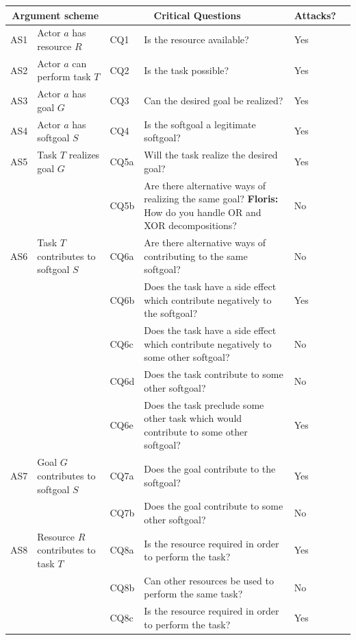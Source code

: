 \documentclass[11.5pt,two column]{llncs}
\newcommand{\floris}[1]{{\color{red}\textbf{Floris: }#1}}
\begin{document}
\begin{table}[h]
\centering
\begin{tabular}{|l|l|l|l|l|l|}
\hline
\multicolumn{2}{|c|}{\textbf{Argument scheme}} & \multicolumn{2}{c|}{\textbf{Critical Questions}} & \textbf{Attacks?}\\
\hline
AS1 & Actor $a$ has resource $R$ & CQ1 &Is the resource available? & Yes\\ %
\hline
AS2 & Actor $a$ can perform task $T$ & CQ2 &Is the task possible? & Yes\\
\hline
AS3 & Actor $a$ has goal $G$ & CQ3 & Can the desired goal be realized? & Yes\\
\hline
AS4 & Actor $a$ has softgoal $S$ & CQ4 & Is the softgoal a legitimate softgoal? & Yes\\
\hline
\hline
AS5 & Task $T$ realizes goal $G$ & CQ5a & Will the task realize the desired goal? & Yes\\
& & CQ5b & Are there alternative ways of realizing the same goal? \floris{How do you handle OR and XOR decompositions?} & No\\ %
\hline
AS6 & Task $T$ contributes to softgoal $S$ & CQ6a & Are there alternative ways of contributing to the same softgoal? & No\\
&& CQ6b & Does the task have a side effect which contribute negatively to the softgoal?&Yes\\
&& CQ6c & Does the task have a side effect which contribute negatively to some other softgoal? & No\\
&& CQ6d & Does the task contribute to some other softgoal?&No\\
&& CQ6e & Does the task preclude some other task which would contribute to some other softgoal?&Yes\\
\hline
AS7 & Goal $G$ contributes to softgoal $S$ & CQ7a & Does the goal contribute to the softgoal? & Yes\\
&& CQ7b & Does the goal contribute to some other softgoal? & No\\ %
\hline
AS8 & Resource $R$ contributes to task $T$ & CQ8a & Is the resource required in order to perform the task? & Yes\\
&&CQ8b & Can other resources be used to perform the same task? & No\\
&&CQ8c & Is the resource required in order to perform the task? & Yes\\

\end{tabular}
\end{table}
\end{document}
